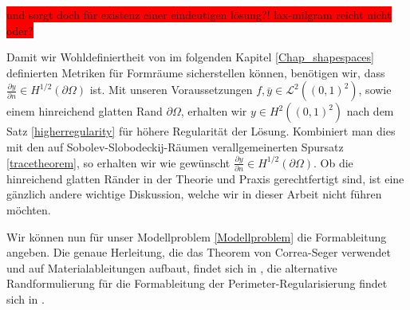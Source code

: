 \colorbox{red}{und sorgt doch für existenz einer eindeutigen lösung?! lax-milgram reicht nicht oder?}

Damit wir Wohldefiniertheit von im folgenden Kapitel \ref{Chap_shapespaces} definierten Metriken für Formräume sicherstellen können, benötigen wir, dass $\frac{\partial y}{\partial n} \in H^{1/2}(\partial\Omega)$ ist. Mit unseren Voraussetzungen $f,\bar{y} \in \mathcal{L}^2((0,1)^2)$, sowie einem hinreichend glatten Rand $\partial\Omega$, erhalten wir $y\in H^2((0,1)^2)$ nach dem Satz  \ref{higherregularity} für höhere Regularität der Lösung. Kombiniert man dies mit den auf Sobolev-Slobodeckij-Räumen verallgemeinerten Spursatz \ref{tracetheorem}, so erhalten wir wie gewünscht $\frac{\partial y}{\partial n} \in H^{1/2}(\partial\Omega)$. Ob die hinreichend glatten Ränder in der Theorie und Praxis gerechtfertigt sind, ist eine gänzlich andere wichtige Diskussion, welche wir in dieser Arbeit nicht führen möchten.

Wir können nun für unser Modellproblem \ref{Modellproblem} die Formableitung angeben. Die genaue Herleitung, die das Theorem von Correa-Seger verwendet und auf  Materialableitungen aufbaut, findet sich in \cite{shape_space}, die alternative Randformulierung für die Formableitung der Perimeter-Regularisierung findet sich in \cite{multigrid}.

